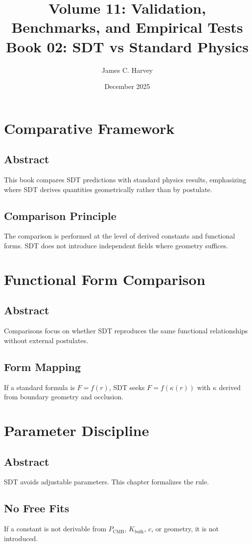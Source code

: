 \documentclass[12pt]{book}
\title{Volume 11: Validation, Benchmarks, and Empirical Tests \\ Book 02: SDT vs Standard Physics}
\author{James C. Harvey}
\date{December 2025}
\begin{document}
\maketitle
\tableofcontents

\chapter{Comparative Framework}

\section*{Abstract}
This book compares SDT predictions with standard physics results, emphasizing where SDT derives
quantities geometrically rather than by postulate.

\section{Comparison Principle}
The comparison is performed at the level of derived constants and functional forms. SDT does not
introduce independent fields where geometry suffices.

\chapter{Functional Form Comparison}

\section*{Abstract}
Comparisons focus on whether SDT reproduces the same functional relationships without external postulates.

\section{Form Mapping}
If a standard formula is $F = f(r)$, SDT seeks $F = f(\kappa(r))$ with $\kappa$ derived from boundary
geometry and occlusion.

\chapter{Parameter Discipline}

\section*{Abstract}
SDT avoids adjustable parameters. This chapter formalizes the rule.

\section{No Free Fits}
If a constant is not derivable from $P_{\text{CMB}}$, $K_{\text{bulk}}$, $c$, or geometry, it is not
introduced.
\end{document}
